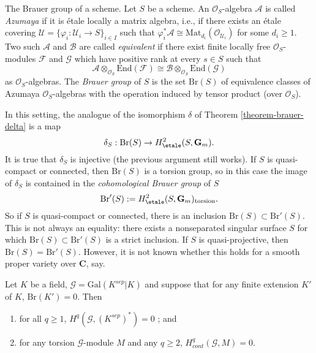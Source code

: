 \noindent
The Brauer group of a scheme.
Let $S$ be a scheme. An $\mathcal{O}_S$-algebra $\mathcal{A}$ is called
{\it Azumaya} if it is \'etale locally a matrix algebra, i.e., if there
exists an \'etale covering $\mathcal{U} = \{ \varphi_i : \mathcal{U}_i \to S
\}_{i \in I}$ such that $\varphi_i^*\mathcal{A} \cong
\text{Mat}_{d_i}(\mathcal{O}_{\mathcal{U}_i})$ for some $d_i \geq 1$. Two such
$\mathcal{A}$ and $\mathcal{B}$ are called {\it equivalent} if there exist
finite locally free $\mathcal{O}_S$-modules $\mathcal{F}$ and $\mathcal{G}$
which have positive rank at every $s \in S$ such that
$$
\mathcal{A} \otimes_{\mathcal{O}_S} \text{End}(\mathcal{F})
\cong
\mathcal{B} \otimes_{\mathcal{O}_S} \text{End}(\mathcal{G})
$$
as $\mathcal{O}_S$-algebras. The {\it Brauer group} of
$S$ is the set $\text{Br}(S)$ of equivalence classes of Azumaya
$\mathcal{O}_S$-algebras with the operation induced by tensor product (over
$\mathcal{O}_S$).

\medskip\noindent
In this setting, the analogue of the isomorphism $\delta$ of
Theorem \ref{theorem-brauer-delta}
is a map
$$
\delta_S: \text{Br}(S) \to H_\etale^2(S, \mathbf{G}_m).
$$
It is true that $\delta_S$ is injective (the previous argument still works). If
$S$ is quasi-compact or connected, then $\text{Br}(S)$ is a torsion group, so
in this case the image of $\delta_S$ is contained in the {\it cohomological
Brauer group} of $S$
$$
\text{Br}'(S) := H_\etale^2(S, \mathbf{G}_m)_\text{torsion}.
$$
So if $S$ is quasi-compact or connected, there is an inclusion $\text{Br}(S)
\subset \text{Br}'(S)$. This is not always an equality: there exists a
nonseparated singular surface $S$ for which $\text{Br}(S) \subset
\text{Br}'(S)$ is a strict inclusion. If $S$ is quasi-projective, then
$\text{Br}(S) = \text{Br}'(S)$. However, it is not known whether this holds for
a smooth proper variety over $\mathbf{C}$, say.


\begin{proposition}
\label{proposition-serre-galois}
Let $K$ be a field, $\mathcal{G} = \text{Gal}(K^{sep}|K)$ and suppose that for
any finite extension $K'$ of $K$, $\text{Br}(K') = 0$. Then
\begin{enumerate}
\item
for all $ q \geq 1$, $H^q (\mathcal{G}, (K^{sep})^*) = 0$ ; and
\item
for any torsion $\mathcal{G}$-module $M$ and any $q \geq 2$, $H_{cont}^q
(\mathcal{G}, M) = 0$.
\end{enumerate}
\end{proposition}

